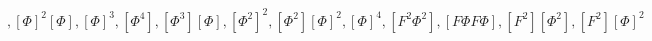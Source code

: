 \begin{equation}
[\Phi^3], [\Phi]^2[\Phi], [\Phi]^3, [\Phi^4],
[\Phi^3][\Phi], [\Phi^2]^2, [\Phi^2][\Phi]^2, [\Phi]^4,
[F^2\Phi^2],[F\Phi F\Phi], [F^2][\Phi^2], [F^2][\Phi]^2\label{allpf}
\end{equation}

